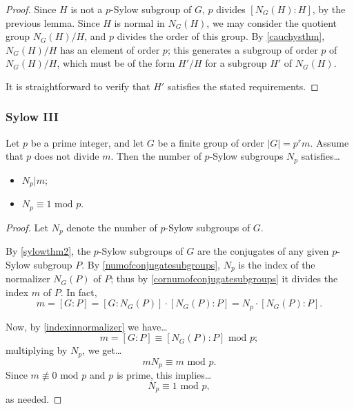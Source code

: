 \begin{proof}
Since $H$ is not a $p$-Sylow subgroup of $G$, $p$ divides $[N_G(H) : H]$, by the previous lemma. Since $H$ is normal in $N_G(H)$, we may consider
the quotient group $N_G(H)/H$, and $p$ divides the order of this group. By \ref{cauchysthm}, $N_G(H)/H$ has an element of order $p$; this generates
a subgroup of order $p$ of $N_G(H)/H$, which must be of the form $H' / H$ for a subgroup $H'$ of $N_G(H)$.

It is straightforward to verify that $H'$ satisfies the stated requirements.
\end{proof}

\subsubsection{Sylow III}\label{sylow3}

\begin{theorem}
\label{sylowthm3}
Let $p$ be a prime integer, and let $G$ be a finite group of order $|G| = p^rm$. Assume that $p$ does not divide $m$. Then the number of $p$-Sylow subgroups $N_p$ satisfies\dots
\begin{itemize}
  \item $N_p | m$;
  \item $N_p \equiv 1 \textrm{ mod } p$.
\end{itemize}
\end{theorem}

\begin{proof}
Let $N_p$ denote the number of $p$-Sylow subgroups of $G$.

By \ref{sylowthm2}, the $p$-Sylow subgroups of $G$ are the conjugates of any given $p$-Sylow subgroup $P$. By \ref{numofconjugatesubgroups}, $N_p$ is the index of the normalizer $N_G(P)$
of $P$; thus by \ref{cornumofconjugatesubgroups} it divides the index $m$ of $P$. In fact,
$$m = [G:P] = [G:N_G(P)] \cdot [N_G(P) : P] = N_p \cdot [N_G(P) : P].$$

Now, by \ref{indexinnormalizer} we have\dots
$$m = [G : P] \equiv [N_G(P) : P] \textrm{ mod } p;$$
multiplying by $N_p$, we get\dots
$$mN_p \equiv m \textrm{ mod } p.$$
Since $m \not \equiv 0 \textrm{ mod } p$ and $p$ is prime, this implies\dots
$$N_p \equiv 1 \textrm{ mod } p,$$
as needed.
\end{proof}